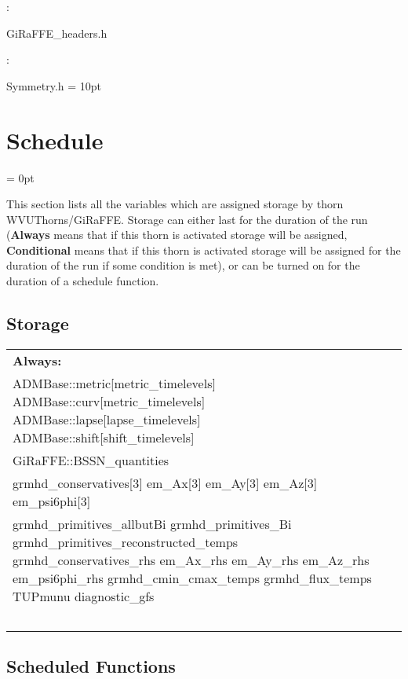 : 



GiRaFFE\_headers.h
\vspace{2mm}

: 

Symmetry.h
\vspace{2mm}\parskip = 10pt 

\section{Schedule} 


\parskip = 0pt


\noindent This section lists all the variables which are assigned storage by thorn WVUThorns/GiRaFFE.  Storage can either last for the duration of the run ({\bf Always} means that if this thorn is activated storage will be assigned, {\bf Conditional} means that if this thorn is activated storage will be assigned for the duration of the run if some condition is met), or can be turned on for the duration of a schedule function.


\subsection*{Storage}

\hspace{5mm}

 \begin{tabular*}{160mm}{ll} 

{\bf Always:}&  ~ \\ 
 ADMBase::metric[metric\_timelevels] ADMBase::curv[metric\_timelevels] ADMBase::lapse[lapse\_timelevels] ADMBase::shift[shift\_timelevels] & ~\\ 
 GiRaFFE::BSSN\_quantities & ~\\ 
 grmhd\_conservatives[3] em\_Ax[3] em\_Ay[3] em\_Az[3] em\_psi6phi[3] & ~\\ 
 grmhd\_primitives\_allbutBi grmhd\_primitives\_Bi grmhd\_primitives\_reconstructed\_temps grmhd\_conservatives\_rhs em\_Ax\_rhs em\_Ay\_rhs em\_Az\_rhs em\_psi6phi\_rhs grmhd\_cmin\_cmax\_temps grmhd\_flux\_temps TUPmunu diagnostic\_gfs & ~\\ 
~ & ~\\ 
\end{tabular*} 


\subsection*{Scheduled Functions}
\vspace{5mm}


